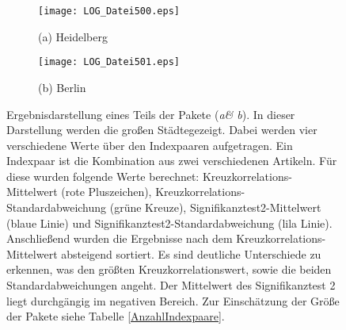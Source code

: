 \documentclass[fontsize=11pt, twoside, a4paper]{scrartcl}
\begin{document}
\begin{figure}[H]
\centering
	\begin{minipage}[t]{0.45\textwidth}
		\begin{figure}[H]
		\texttt{[image: LOG\_Datei500.eps]}
		\caption*{(a) Heidelberg}
		\end{figure}
	\end{minipage}
	\begin{minipage}[t]{0.45\textwidth}
		\begin{figure}[H]
		\texttt{[image: LOG\_Datei501.eps]}
		\caption*{(b) Berlin}
		\end{figure}
	\end{minipage}	
\caption{Ergebnisdarstellung eines Teils der Pakete (\textit{a\& b}). In dieser Darstellung werden die großen Städtegezeigt. Dabei werden vier verschiedene Werte über den Indexpaaren aufgetragen. Ein Indexpaar ist die Kombination aus zwei verschiedenen Artikeln. Für diese wurden folgende Werte berechnet: Kreuzkorrelations-Mittelwert (rote Pluszeichen), Kreuzkorrelations-Standardabweichung (grüne Kreuze), Signifikanztest2-Mittelwert (blaue Linie) und Signifikanztest2-Standardabweichung (lila Linie). Anschließend wurden die Ergebnisse nach dem Kreuzkorrelations-Mittelwert absteigend sortiert. Es sind deutliche Unterschiede zu erkennen, was den größten Kreuzkorrelationswert, sowie die beiden Standardabweichungen angeht. Der Mittelwert des Signifikanztest 2 liegt durchgängig im negativen Bereich. Zur Einschätzung der Größe der Pakete siehe Tabelle \ref{AnzahlIndexpaare}. }	
\label{Abb1}
\end{figure}
\begin{verbatim}






\end{verbatim}	
\end{document}
